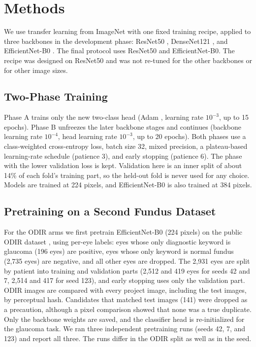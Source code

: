 \section{Methods}
\label{sec:methods}
We use transfer learning from ImageNet \cite{deng2009} with one fixed training recipe, applied to three backbones in the development phase: ResNet50 \cite{he2016}, DenseNet121 \cite{huang2017}, and EfficientNet-B0 \cite{tan2019}. The final protocol uses ResNet50 and EfficientNet-B0. The recipe was designed on ResNet50 and was not re-tuned for the other backbones or for other image sizes.

\subsection{Two-Phase Training}
Phase A trains only the new two-class head (Adam \cite{kingma2015}, learning rate $10^{-3}$, up to 15 epochs). Phase B unfreezes the later backbone stages and continues (backbone learning rate $10^{-4}$, head learning rate $10^{-3}$, up to 20 epochs). Both phases use a class-weighted cross-entropy loss, batch size 32, mixed precision, a plateau-based learning-rate schedule (patience 3), and early stopping (patience 6). The phase with the lower validation loss is kept. Validation here is an inner split of about 14\% of each fold's training part, so the held-out fold is never used for any choice. Models are trained at 224 pixels, and EfficientNet-B0 is also trained at 384 pixels.

\subsection{Pretraining on a Second Fundus Dataset}
For the ODIR arms we first pretrain EfficientNet-B0 (224 pixels) on the public ODIR dataset \cite{odir2019}, using per-eye labels: eyes whose only diagnostic keyword is glaucoma (196 eyes) are positive, eyes whose only keyword is normal fundus (2,735 eyes) are negative, and all other eyes are dropped. The 2,931 eyes are split by patient into training and validation parts (2,512 and 419 eyes for seeds 42 and 7, 2,514 and 417 for seed 123), and early stopping uses only the validation part. ODIR images are compared with every project image, including the test images, by perceptual hash. Candidates that matched test images (141) were dropped as a precaution, although a pixel comparison showed that none was a true duplicate. Only the backbone weights are saved, and the classifier head is re-initialized for the glaucoma task. We ran three independent pretraining runs (seeds 42, 7, and 123) and report all three. The runs differ in the ODIR split as well as in the seed.

